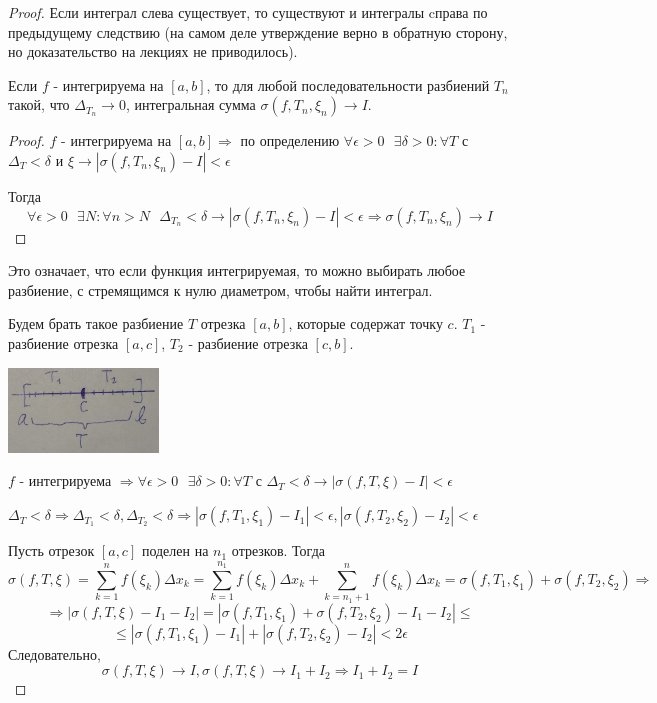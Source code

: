     \begin{proof}
    	Если интеграл слева существует, то существуют и интегралы cправа по предыдущему следствию (на самом деле утверждение верно в обратную сторону, но доказательство на лекциях не приводилось).
    	
    	\begin{mention}
    		Если $f$ - интегрируема на $[a, b]$, то для любой последовательности разбиений $T_n$ такой, что $\Delta_{T_n} \to 0$, интегральная сумма $\sigma(f, T_n, \xi_n) \to I$.
    	\end{mention}
    	\begin{proof}
    		$f$ - интегрируема на $[a, b] \Rightarrow$ по определению $\forall \epsilon > 0 \text{ } \exists \delta > 0: \forall T$ с $\Delta_T < \delta$ и $\xi \rightarrow |\sigma(f, T_n, \xi_n) - I| < \epsilon$
    		
    		Тогда
    		\[ \forall \epsilon > 0 \text{ } \exists N: \forall n > N \text{ } \Delta_{T_n} < \delta \rightarrow |\sigma(f, T_n, \xi_n) - I| < \epsilon \Rightarrow \sigma(f, T_n, \xi_n) \rightarrow I \]
    	\end{proof}
    	
    	Это означает, что если функция интегрируемая, то можно выбирать любое разбиение, с стремящимся к нулю диаметром, чтобы найти интеграл.
    	
    	Будем брать такое разбиение $T$ отрезка $[a, b]$, которые содержат точку $c$. $T_1$ - разбиение отрезка $[a, c]$, $T_2$ - разбиение отрезка $[c, b]$.
    	\begin{center}
    		\includegraphics[width=0.3\textwidth]{img/lecture28/partition_with_c_dot}
    	\end{center}
    	
    	$f$ - интегрируема $\Rightarrow \forall \epsilon > 0 \text{ } \exists \delta > 0: \forall T \text{ с } \Delta_T < \delta \rightarrow |\sigma(f, T, \xi) - I| < \epsilon$
    	
    	$\Delta_T < \delta \Rightarrow \Delta_{T_1} < \delta, \Delta_{T_2} < \delta \Rightarrow |\sigma(f, T_1, \xi_1) - I_1| < \epsilon, |\sigma(f, T_2, \xi_2) - I_2| < \epsilon$
    	
    	Пусть отрезок $[a, c]$ поделен на $n_1$ отрезков. Тогда    	
    	\[ \sigma(f, T, \xi) = \sum_{k = 1}^n f(\xi_k) \Delta x_k = \sum_{k = 1}^{n_1} f(\xi_k) \Delta x_k + \sum_{k = n_1 + 1}^n f(\xi_k) \Delta x_k = \sigma(f, T_1, \xi_1) + \sigma(f, T_2, \xi_2) \Rightarrow \]
    	\[ \Rightarrow |\sigma(f, T, \xi) - I_1 - I_2| = |\sigma(f, T_1, \xi_1) + \sigma(f, T_2, \xi_2) - I_1 - I_2| \leqslant \]
    	\[ \leqslant |\sigma(f, T_1, \xi_1) - I_1| + |\sigma(f, T_2, \xi_2) - I_2| < 2\epsilon \]
    	Следовательно,
    	\[ \sigma(f, T, \xi) \to I, \sigma(f, T, \xi) \to I_1 + I_2 \Rightarrow I_1 + I_2 = I \]
    \end{proof}
    
